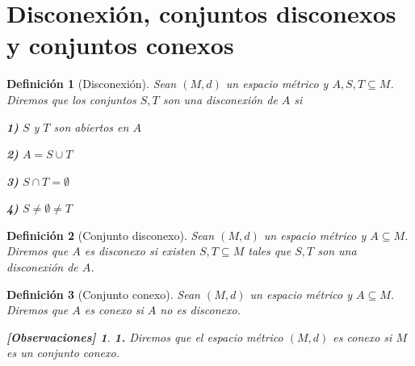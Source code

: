 \documentclass[oneside]{book} %
\theoremstyle{Teorema}
\newtheorem{Definicion}{Definición}[chapter]
\theoremstyle{Ejemplos}
\theoremstyle{[Obs]}
\newtheorem*{Obs}{[Observaciones]}
\renewcommand{\{}{\left\lbrace} %
\renewcommand{\}}{\right\rbrace} %
\renewcommand{\u}{\cup} %
\newcommand{\n}{\cap} %
\renewcommand{\sc}{\subseteq} %
\begin{document}
		\section{Disconexión, conjuntos disconexos y conjuntos conexos}

			\begin{Definicion}[Disconexión]\setlength{\parindent}{0em}

				Sean $(M, d)$ un espacio métrico y $A, S, T \sc M$. Diremos que los conjuntos $S, T$ son una disconexión de $A$ si 
				
				\textbf{1)} $S$ y $T$ son abiertos en $A$
				
				\textbf{2)} $A = S \u T$

				\textbf{3)} $S \n T = \emptyset$

				\textbf{4)} $S \neq \emptyset \neq T$ 

			\end{Definicion}

			\begin{Definicion}[Conjunto disconexo]\setlength{\parindent}{0em}
			
				Sean $(M, d)$ un espacio métrico y $A \sc M$. Diremos que $A$ es disconexo si existen $S, T \sc M$ tales que $S, T$ son una disconexión de $A$.
			
			\end{Definicion}

			\begin{Definicion}[Conjunto conexo]\setlength{\parindent}{0em}
			
				Sean $(M, d)$ un espacio métrico y $A \sc M$. Diremos que $A$ es conexo si $A$ no es disconexo.

				\begin{Obs}
				
					\textbf{1.} Diremos que el espacio métrico $(M, d)$ es conexo si $M$ es un conjunto conexo.
				
				\end{Obs}
			
			\end{Definicion}
\end{document}
